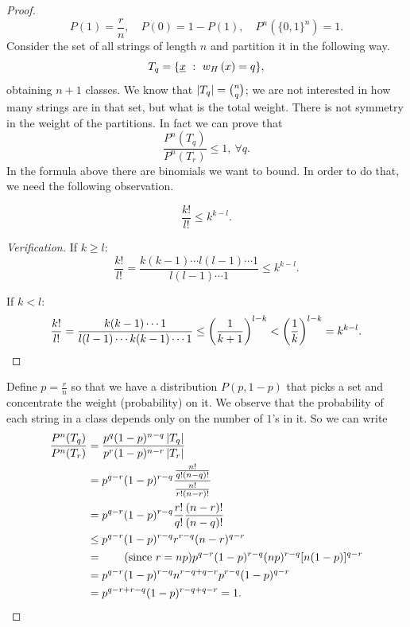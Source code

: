 \begin{proof}
	\begin{equation*}
		P(1) = \frac{r}{n}, \quad P(0) = 1 - P(1), \quad P^n(\{0, 1\}^n) = 1.
	\end{equation*}
	Consider the set of all strings of length $n$ and partition it in the following way.
	\begin{equation*}
		T_q = \{\underline{x}\ :\ w_H\left(x\right) = q\},
	\end{equation*}
	obtaining $n +1$ classes. 
	We know that $\left|{T_q}\right| = \binom{n}{q}$; we are not interested in how many strings are in that set, but what is the total weight.
	There is not symmetry in the weight of the partitions.
	In fact we can prove that
	\begin{equation*}
		\frac{P^n(T_q)}{P^n(T_r)} \le 1,\ \forall q.
	\end{equation*}
	In the formula above there are binomials we want to bound.
	In order to do that, we need the following observation.

	\begin{obs}
		\begin{equation*}
			\frac{k!}{l!} \le k^{k-l}.
		\end{equation*}
	\end{obs}

	\begin{proof}[Verification]
		If $k \ge l$:
			\begin{equation*}
				\frac{k!}{l!} = \frac{k(k-1) \cdots l(l -1) \cdots 1}{l(l -1) \cdots 1} \le k^{k-l}.
			\end{equation*}

		If $k < l$:
			\begin{equation*}
				\frac{k!}{l!} = \frac{k(k-1) \cdots 1}{l(l -1) \cdots k(k-1) \cdots 1} \le \left(\frac{1}{k+1}\right)^{l-k} < \left(\frac{1}{k}\right)^{l-k} = k^{k-l}. \qedhere
			\end{equation*}
	\end{proof}

	Define $p = \frac{r}{n}$  so that we have a distribution $P(p, 1-p)$ that picks a set and concentrate the weight (probability) on it.
	We observe that the probability of each string in a class depends only on the number of $1$'s in it.
	So we can write
	\begin{align*}
		\frac{P^n(T_q)}{P^n(T_r)}
		& =
		\frac{p^q(1-p)^{n-q}\left|{T_q}\right|}{p^r(1-p)^{n-r}\left|{T_r}\right|}
		\\
		& =
		p^{q-r}(1-p)^{r-q} \frac{\frac{n!}{q!(n-q)!}}{\frac{n!}{r!(n-r)!}}
		\\
		& =
		p^{q-r}(1-p)^{r-q}\frac{r!}{q!}\frac{(n-r)!}{(n-q)!}
		\\
		& \le
		p^{q-r}(1-p)^{r-q}r^{r-q}(n-r)^{q-r}
		\\
		& =
		\tag{since $r = np$}
		p^{q-r}(1-p)^{r-q} (np)^{r-q}[n(1-p)]^{q-r}
		\\
		& =
		p^{q-r}(1-p)^{r-q}n^{r-q+q-r}p^{r-q}(1-p)^{q-r}
		\\
		& =
		p^{q-r + r-q}(1-p)^{r-q+q-r}
		=
		1.
	\end{align*}


\end{proof}
